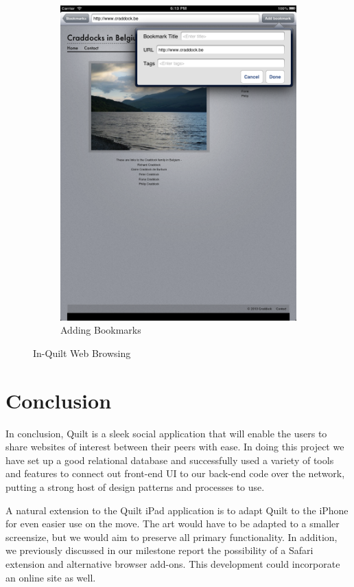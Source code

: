 \documentclass[a4wide, 10pt]{article}
\begin{document}
\begin{figure}
\begin{subfigure}[b]{0.4\textwidth}
                \includegraphics[width=\textwidth]{"screenshots/App Browsing"}
                \caption{Adding Bookmarks}
        \end{subfigure}
        \caption{In-Quilt Web Browsing}\label{fig:browse}
\end{figure}

\section{Conclusion}

In conclusion, Quilt is a sleek social application that will enable the users to share websites of interest between their peers with ease. In doing this project we have set up a good relational database and successfully used a variety of tools and features to connect out front-end UI to our back-end code over the network, putting a strong host of design patterns and processes to use. 

A natural extension to the Quilt iPad application is to adapt Quilt to the iPhone for even easier use on the move. The art would have to be adapted to a smaller screensize, but we would aim to preserve all primary functionality. In addition, we previously discussed in our milestone report the possibility of a Safari extension and alternative browser add-ons. This development could incorporate an online site as well.
\end{document}
